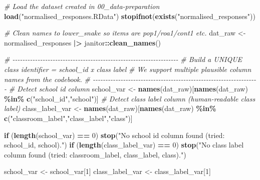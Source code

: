 \documentclass[
  10pt,
]{article}
\newenvironment{Shaded}{\begin{snugshade}}{\end{snugshade}}
\newcommand{\CommentTok}[1]{\textcolor[rgb]{0.56,0.35,0.01}{\textit{#1}}}
\newcommand{\ControlFlowTok}[1]{\textcolor[rgb]{0.13,0.29,0.53}{\textbf{#1}}}
\newcommand{\DecValTok}[1]{\textcolor[rgb]{0.00,0.00,0.81}{#1}}
\newcommand{\FunctionTok}[1]{\textcolor[rgb]{0.13,0.29,0.53}{\textbf{#1}}}
\newcommand{\NormalTok}[1]{#1}
\newcommand{\OtherTok}[1]{\textcolor[rgb]{0.56,0.35,0.01}{#1}}
\newcommand{\SpecialCharTok}[1]{\textcolor[rgb]{0.81,0.36,0.00}{\textbf{#1}}}
\newcommand{\StringTok}[1]{\textcolor[rgb]{0.31,0.60,0.02}{#1}}
\begin{document}
\begin{Shaded}
\begin{Highlighting}[]
\CommentTok{\# Load the dataset created in 00\_data{-}preparation}
\FunctionTok{load}\NormalTok{(}\StringTok{"normalised\_responses.RData"}\NormalTok{)}
\FunctionTok{stopifnot}\NormalTok{(}\FunctionTok{exists}\NormalTok{(}\StringTok{"normalised\_responses"}\NormalTok{))}

\CommentTok{\# Clean names to lower\_snake so items are pop1/roa1/cont1 etc.}
\NormalTok{dat\_raw }\OtherTok{\textless{}{-}}\NormalTok{ normalised\_responses }\SpecialCharTok{|\textgreater{}}\NormalTok{ janitor}\SpecialCharTok{::}\FunctionTok{clean\_names}\NormalTok{()}

\CommentTok{\# {-}{-}{-}{-}{-}{-}{-}{-}{-}{-}{-}{-}{-}{-}{-}{-}{-}{-}{-}{-}{-}{-}{-}{-}{-}{-}{-}{-}{-}{-}{-}{-}{-}{-}{-}{-}{-}{-}{-}{-}{-}{-}{-}{-}{-}{-}{-}{-}{-}{-}{-}{-}{-}{-}{-}{-}{-}{-}{-}{-}{-}{-}{-}{-}{-}{-}}
\CommentTok{\# Build a UNIQUE class identifier = school\_id x class label}
\CommentTok{\# We support multiple plausible column names from the codebook.}
\CommentTok{\# {-}{-}{-}{-}{-}{-}{-}{-}{-}{-}{-}{-}{-}{-}{-}{-}{-}{-}{-}{-}{-}{-}{-}{-}{-}{-}{-}{-}{-}{-}{-}{-}{-}{-}{-}{-}{-}{-}{-}{-}{-}{-}{-}{-}{-}{-}{-}{-}{-}{-}{-}{-}{-}{-}{-}{-}{-}{-}{-}{-}{-}{-}{-}{-}{-}{-}}
\CommentTok{\# Detect school id column}
\NormalTok{school\_var }\OtherTok{\textless{}{-}} \FunctionTok{names}\NormalTok{(dat\_raw)[}\FunctionTok{names}\NormalTok{(dat\_raw) }\SpecialCharTok{\%in\%} \FunctionTok{c}\NormalTok{(}\StringTok{"school\_id"}\NormalTok{,}\StringTok{"school"}\NormalTok{)]}
\CommentTok{\# Detect class label column (human{-}readable class label)}
\NormalTok{class\_label\_var }\OtherTok{\textless{}{-}} \FunctionTok{names}\NormalTok{(dat\_raw)[}\FunctionTok{names}\NormalTok{(dat\_raw) }\SpecialCharTok{\%in\%} \FunctionTok{c}\NormalTok{(}\StringTok{"classroom\_label"}\NormalTok{,}\StringTok{"class\_label"}\NormalTok{,}\StringTok{"class"}\NormalTok{)]}

\ControlFlowTok{if}\NormalTok{ (}\FunctionTok{length}\NormalTok{(school\_var) }\SpecialCharTok{==} \DecValTok{0}\NormalTok{) }\FunctionTok{stop}\NormalTok{(}\StringTok{"No school id column found (tried: school\_id, school)."}\NormalTok{)}
\ControlFlowTok{if}\NormalTok{ (}\FunctionTok{length}\NormalTok{(class\_label\_var) }\SpecialCharTok{==} \DecValTok{0}\NormalTok{) }\FunctionTok{stop}\NormalTok{(}\StringTok{"No class label column found (tried: classroom\_label, class\_label, class)."}\NormalTok{)}

\NormalTok{school\_var }\OtherTok{\textless{}{-}}\NormalTok{ school\_var[}\DecValTok{1}\NormalTok{]}
\NormalTok{class\_label\_var }\OtherTok{\textless{}{-}}\NormalTok{ class\_label\_var[}\DecValTok{1}\NormalTok{]}


\end{Highlighting}
\end{Shaded}
\end{document}
